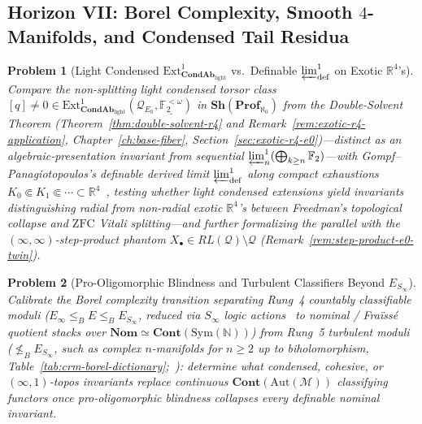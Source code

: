 \documentclass[10pt,twoside,openright]{book}
\theoremstyle{crmplain}
\newtheorem{problem}{Problem}[chapter]
\theoremstyle{crmdef}
\theoremstyle{crmremark}
\begin{document}
\subsection*{Horizon VII: Borel Complexity, Smooth $4$-Manifolds, and Condensed Tail Residua}

\begin{problem}[Light Condensed $\mathrm{Ext}^1_{\mathbf{CondAb}_{\mathrm{light}}}$ vs.\ Definable $\varprojlim^1_{\mathrm{def}}$ on Exotic $\mathbb{R}^4$'s]\label{prob:open-13}
Compare the non-splitting light condensed torsor class $[q] \neq 0 \in \mathrm{Ext}^1_{\mathbf{CondAb}_{\mathrm{light}}}(\mathcal{Q}_{E_0}, \underline{\mathbb{F}_2^{<\omega}})$ in $\mathbf{Sh}(\mathbf{Prof}_{\aleph_0})$ from the Double-Solvent Theorem (Theorem~\ref{thm:double-solvent-r4} and Remark~\ref{rem:exotic-r4-application}, Chapter~\ref{ch:base-fiber}, Section~\ref{sec:exotic-r4-e0})---distinct as an algebraic-presentation invariant from sequential $\varprojlim^1_n(\bigoplus_{k \ge n} \mathbb{F}_2)$---with Gompf--Panagiotopoulos's definable derived limit $\varprojlim^1_{\mathrm{def}}$ along compact exhaustions $K_0 \Subset K_1 \Subset \cdots \subset \mathbb{R}^4$~\cite{GompfPanagiotopoulos26,BergfalkSmythe25}, testing whether light condensed extensions yield invariants distinguishing radial from non-radial exotic $\mathbb{R}^4$'s between Freedman's topological collapse and $\mathrm{ZFC}$ Vitali splitting---and further formalizing the parallel with the $(\infty,\infty)$-step-product phantom $X_\bullet \in RL(\mathcal{Q}) \setminus \mathcal{Q}$ (Remark~\ref{rem:step-product-e0-twin}).
\end{problem}

\begin{problem}[Pro-Oligomorphic Blindness and Turbulent Classifiers Beyond $E_{S_\infty}$]\label{prob:open-14}
Calibrate the Borel complexity transition separating Rung~4 countably classifiable moduli ($E_\infty \le_B E \le_B E_{S_\infty}$, reduced via $S_\infty$ logic actions~\cite{BeckerKechris96,BergfalkSmythe25} to nominal / Fra\"iss\'e quotient stacks over $\mathbf{Nom} \simeq \mathbf{Cont}(\mathrm{Sym}(\mathbb{N}))$) from Rung~5 turbulent moduli ($\not\le_B E_{S_\infty}$, such as complex $n$-manifolds for $n \ge 2$ up to biholomorphism, Table~\ref{tab:crm-borel-dictionary};~\cite{HjorthKechris00,Hjorth00,GompfPanagiotopoulos26,Kihara26}): determine what condensed, cohesive, or $(\infty, 1)$-topos invariants replace continuous $\mathbf{Cont}(\mathrm{Aut}(\mathcal{M}))$ classifying functors once pro-oligomorphic blindness collapses every definable nominal invariant.
\end{problem}
\end{document}

